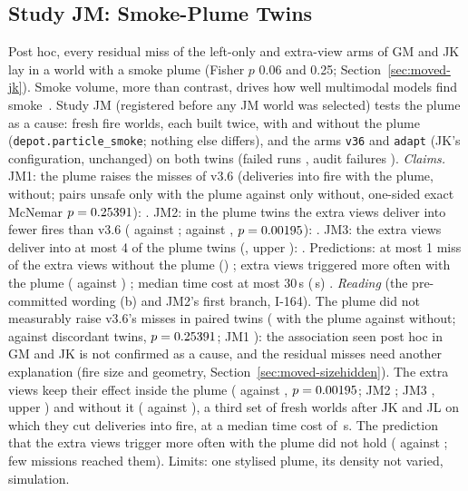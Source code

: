 \subsection{Study JM: Smoke-Plume Twins}\label{sec:moved-jm}
Post hoc, every residual miss of the left-only and extra-view arms of GM and JK lay in a world with a smoke plume (Fisher $p$ 0.06 and 0.25; Section~\ref{sec:moved-jk}). Smoke volume, more than contrast, drives how well multimodal models find smoke~\cite{qi2026smokebench}. Study JM (registered before any JM world was selected) tests the plume as a cause: \JMTwins{} fresh fire worlds, each built twice, with and without the plume (\texttt{depot.particle\_smoke}; nothing else differs), and the arms \texttt{v36} and \texttt{adapt} (JK's configuration, unchanged) on both twins (failed runs \JMFailed, audit failures \JMAudit).
\emph{Claims.} JM1: the plume raises the misses of v3.6 (deliveries into fire \JMVSmoke{} with the plume, \JMVClear{} without; \JMSmokeVFirst{} pairs unsafe only with the plume against \JMSmokeVSecond{} only without, one-sided exact McNemar $p=0.25391$): \JMOneHolds. JM2: in the plume twins the extra views deliver into fewer fires than v3.6 (\JMAdaptSmoke{} against \JMVSmoke; \JMArmSmokeFirst{} against \JMArmSmokeSecond, $p=0.00195$): \JMTwoHolds. JM3: the extra views deliver into at most 4 of the plume twins (\JMAdaptSmoke, upper \JMAdaptSmokeUpper): \JMThreeHolds. Predictions: at most 1 miss of the extra views without the plume (\JMAdaptClear) \JMPredOneHolds; extra views triggered more often with the plume (\JMTrigSmoke{} against \JMTrigClear) \JMPredTwoHolds; median time cost at most 30\,s (\JMTimeCost\,s) \JMPredThreeHolds.
\emph{Reading} (the pre-committed wording (b) and JM2's first branch, I-164). The plume did not measurably raise v3.6's misses in paired twins (\JMVSmoke{} with the plume against \JMVClear{} without; \JMSmokeVFirst{} against \JMSmokeVSecond{} discordant twins, $p=0.25391$; JM1 \JMOneHolds): the association seen post hoc in GM and JK is not confirmed as a cause, and the residual misses need another explanation (fire size and geometry, Section~\ref{sec:moved-sizehidden}). The extra views keep their effect inside the plume (\JMAdaptSmoke{} against \JMVSmoke, $p=0.00195$; JM2 \JMTwoHolds; JM3 \JMThreeHolds, upper \JMAdaptSmokeUpper) and without it (\JMAdaptClear{} against \JMVClear), a third set of fresh worlds after JK and JL on which they cut deliveries into fire, at a median time cost of \JMTimeCost\,s. The prediction that the extra views trigger more often with the plume did not hold (\JMTrigSmoke{} against \JMTrigClear; few missions reached them). Limits: one stylised plume, its density not varied, simulation.

